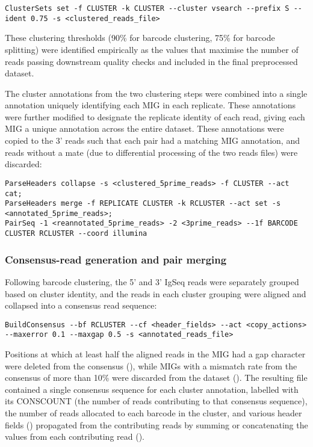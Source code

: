 \begin{lstlisting}
ClusterSets set -f CLUSTER -k CLUSTER --cluster vsearch --prefix S --ident 0.75 -s <clustered_reads_file>
\end{lstlisting}

These clustering thresholds (90\% for barcode clustering, 75\% for barcode splitting) were identified empirically as the values that maximise the number of reads passing downstream quality checks and included in the final preprocessed dataset.

The cluster annotations from the two clustering steps were combined into a single annotation uniquely identifying each MIG in each replicate. These annotations were further modified to designate the replicate identity of each read, giving each MIG a unique annotation across the entire dataset. These annotations were copied to the 3' reads such that each pair had a matching MIG annotation, and reads without a mate (due to differential processing of the two reads files) were discarded:

\begin{lstlisting}
ParseHeaders collapse -s <clustered_5prime_reads> -f CLUSTER --act cat;
ParseHeaders merge -f REPLICATE CLUSTER -k RCLUSTER --act set -s <annotated_5prime_reads>;
PairSeq -1 <reannotated_5prime_reads> -2 <3prime_reads> --1f BARCODE CLUSTER RCLUSTER --coord illumina
\end{lstlisting}

\subsubsection{Consensus-read generation and pair merging}
\label{sec:methods_comp_igpreproc_consensus}

Following barcode clustering, the 5' and 3' IgSeq reads were separately grouped based on cluster identity, and the reads in each cluster grouping were aligned and collapsed into a consensus read sequence:

\begin{lstlisting}
BuildConsensus --bf RCLUSTER --cf <header_fields> --act <copy_actions> --maxerror 0.1 --maxgap 0.5 -s <annotated_reads_file>
\end{lstlisting}

Positions at which at least half the aligned reads in the MIG had a gap character were deleted from the consensus (), while MIGs with a mismatch rate from the consensus of more than 10\% were discarded from the dataset (). The resulting  file contained a single consensus sequence for each cluster annotation, labelled with its CONSCOUNT (the number of reads contributing to that consensus sequence),  the number of reads allocated to each barcode in the cluster, and various header fields () propagated from the contributing reads by summing or concatenating the values from each contributing read (). 

